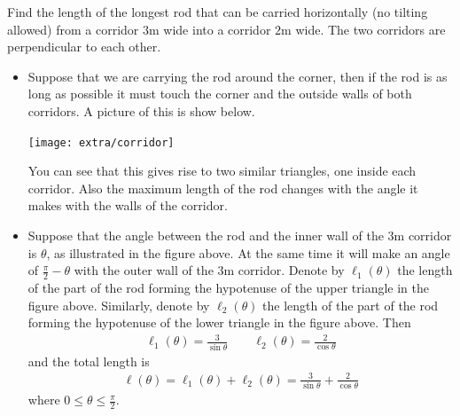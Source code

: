 \begin{eg}\label{APPglobalMaxMinJ}
Find the length of the longest rod that can be carried horizontally (no
tilting allowed) from a corridor $3$m wide into a corridor $2$m wide.
The two corridors are perpendicular to each other.


\soln
\begin{itemize}
 \item Suppose that we are carrying the rod around the corner, then if the rod is as long
as possible it must touch the corner and the outside walls of both corridors. A
picture of this is show below.
\begin{efig}
\begin{center}
   \texttt{[image: extra/corridor]}
\end{center}
\end{efig}
You can see that this gives rise to two similar triangles, one inside each corridor. Also
the maximum length of the rod changes with the angle it makes with the walls of the
corridor.

\item Suppose that the angle between the rod and the inner wall of the $3$m
corridor is $\theta$, as illustrated in the figure above. At the same time it will make an
angle of $\frac{\pi}{2}-\theta$ with the outer wall of the 3m corridor. Denote by
$\ell_1(\theta)$ the length of the part of the rod forming the hypotenuse of the upper
triangle in the figure above. Similarly, denote by $\ell_2(\theta)$ the length of the part
of the rod forming the hypotenuse of the lower triangle in the figure above.  Then
\begin{align*}
\ell_1(\theta) = \frac{3}{\sin\theta}\qquad
\ell_2(\theta) = \frac{2}{\cos\theta}
\end{align*}
and the total length is
\begin{align*}
\ell(\theta) = \ell_1(\theta) +\ell_2(\theta)
             = \frac{3}{\sin\theta}+\frac{2}{\cos\theta}
\end{align*}
where $0 \leq \theta \leq \frac{\pi}{2}$.


\end{itemize}
\end{eg}
